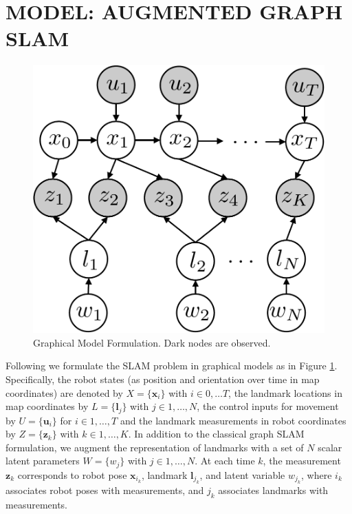 \section{MODEL: AUGMENTED GRAPH SLAM}
\label{sec:model}
\begin{figure}[!t]
\begin{center}
 \includegraphics[width=0.5\columnwidth]{fig/model} 
\end{center}
\caption{Graphical Model Formulation. Dark nodes are observed.}
\label{fig:model}
\end{figure}

Following \cite{isam} we formulate the SLAM problem in graphical models as in Figure \ref{fig:model}. Specifically, the robot states (as position and orientation over time in map coordinates) are denoted by $X = \{\boldsymbol{x}_i\}$ with $i \in 0, \dots T$, the landmark locations in map coordinates by $L = \{\boldsymbol{l}_j\}$ with $j \in 1,\dots, N$, the control inputs for movement by $U = \{\boldsymbol{u}_i\}$ for $i \in 1,\dots, T$ and the landmark measurements in robot coordinates by $Z = \{\boldsymbol{z}_k\}$ with $k \in 1, \dots, K$. In addition to the classical graph SLAM formulation, we augment the representation of landmarks with a set of $N$ scalar latent parameters $W = \{w_j\}$ with $j \in 1, \dots, N$. At each time $k$, the measurement $\boldsymbol{z}_k$ corresponds to robot pose $\boldsymbol{x}_{i_k}$, landmark $\boldsymbol{l}_{j_k}$, and latent variable $w_{j_k}$, where $i_k$ associates robot poses with measurements, and $j_k$ associates landmarks with measurements.


